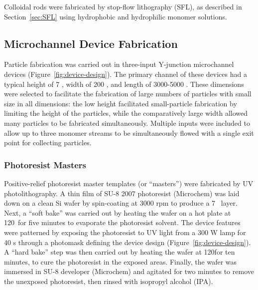 Colloidal rods were fabricated by stop-flow lithography (SFL), as described in Section~\ref{sec:SFL} using
hydrophobic and hydrophilic monomer solutions.  

\subsection{Microchannel Device Fabrication}

Particle fabrication was carried out in 
three-input Y-junction microchannel devices (Figure~\ref{fig:device-design}).
The primary channel of these devices had a typical 
height of 7 \microns, width of 200 \microns, and length of 3000-5000 \microns. These dimensions were selected
to facilitate the fabrication of large numbers of particles with small size in all dimensions: the low height
facilitated small-particle fabrication by limiting the height of the particles, while the comparatively large
width allowed many particles to be fabricated simultaneously. Multiple inputs were included to allow up to three
monomer streams to be simultaneously flowed with a single exit point for collecting particles.

\subsubsection{Photoresist Masters}


Positive-relief photoresist master templates (or ``masters'') were fabricated by UV photolithography. A thin film
of SU-8 2007 photoresist (Microchem) was laid down on a clean Si wafer by spin-coating at 3000 rpm to produce a 
7 \microns~layer. Next, a ``soft bake'' was carried out by heating the wafer on a hot plate at 
120\degC~for five minutes to evaporate the photoresist solvent.  The device features were patterned by exposing the 
photoresist to UV light from a 300 W lamp for 40 s through a photomask defining the device design 
(Figure~\ref{fig:device-design}). A ``hard bake'' step
was then carried out by heating the wafer at 120\degC for ten minutes, to cure the photoresist in the exposed areas.
Finally, the wafer was immersed in SU-8 developer (Microchem) and agitated for two minutes to remove the unexposed
photoresist, then rinsed with isopropyl alcohol (IPA).

